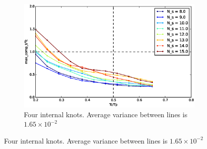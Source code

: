 \begin{figure}[!h]
        \centering
        ~ %
        \begin{subfigure}[b]{0.48\textwidth}
                \includegraphics[width=\textwidth]{./img/realtime/Scenario_3__N_knots_4/mcttc-tctp.eps}
                \caption{Four internal knots. Average variance between lines is $1.65\times 10^{-2}$}\label{fig:uni34}
        \end{subfigure}
        

\end{figure}
